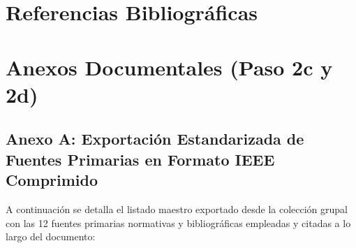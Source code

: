\section{Referencias Bibliográficas}
\printbibliography[heading=none]
\newpage
\section*{Anexos Documentales (Paso 2c y 2d)}
\subsection*{Anexo A: Exportación Estandarizada de Fuentes Primarias en Formato IEEE Comprimido}
A continuación se detalla el listado maestro exportado desde la colección grupal con las 12 fuentes primarias normativas y bibliográficas empleadas y citadas a lo largo del documento:
